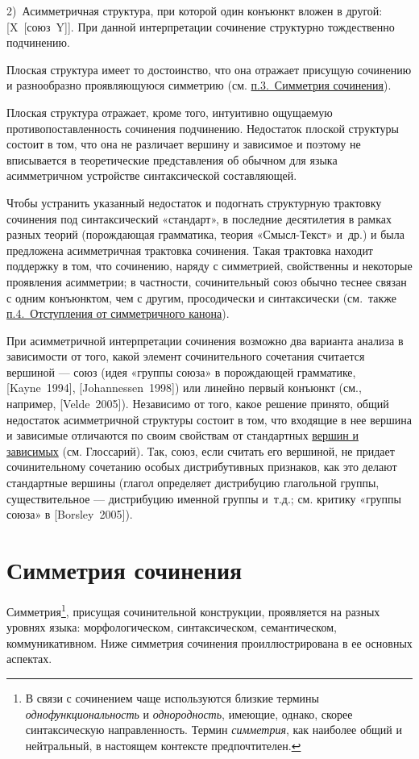 2)~Асимметричная структура, при которой один конъюнкт вложен в другой:
{[}X~{[}союз~Y{]}{]}. При данной интерпретации сочинение структурно
тождественно подчинению.

Плоская структура имеет то достоинство, что она отражает присущую
сочинению и разнообразно проявляющуюся симметрию (см.
\underline{п.3.~Симметрия сочинения}).

Плоская структура отражает, кроме того, интуитивно ощущаемую
противопоставленность сочинения подчинению. Недостаток плоской структуры
состоит в том, что она не различает вершину и зависимое и поэтому не
вписывается в теоретические представления об обычном для языка
асимметричном устройстве синтаксической составляющей.

Чтобы устранить указанный недостаток и подогнать структурную трактовку
сочинения под синтаксический «стандарт», в последние десятилетия в
рамках разных теорий (порождающая грамматика, теория «Смысл-Текст»
и~др.) и была предложена асимметричная трактовка сочинения. Такая
трактовка находит поддержку в том, что сочинению, наряду с симметрией,
свойственны и некоторые проявления асимметрии; в частности,
сочинительный союз обычно теснее связан с одним конъюнктом, чем с
другим, просодически и синтаксически (см.~также
\underline{п.4.~Отступления от симметричного канона}).

При асимметричной интерпретации сочинения возможно два варианта анализа
в зависимости от того, какой элемент сочинительного сочетания считается
вершиной --- союз (идея «группы союза» в порождающей грамматике,
{[}Kayne~1994{]}, {[}Johannessen~1998{]}) или линейно первый конъюнкт
(см., например, {[}Velde~2005{]}). Независимо от того, какое решение
принято, общий недостаток асимметричной структуры состоит в том, что
входящие в нее вершина и зависимые отличаются по своим свойствам от
стандартных \underline{вершин и зависимых} (см. Глоссарий). Так, союз,
если считать его вершиной, не придает сочинительному сочетанию особых
дистрибутивных признаков, как это делают стандартные вершины (глагол
определяет дистрибуцию глагольной группы, существительное --- дистрибуцию
именной группы и~т.д.; см. критику «группы союза» в {[}Borsley~2005{]}).

\section{Симметрия
сочинения}\label{ux441ux438ux43cux43cux435ux442ux440ux438ux44f-ux441ux43eux447ux438ux43dux435ux43dux438ux44f}

Симметрия\footnote{В связи с сочинением чаще используются близкие
  термины \textit{однофункциональность} и \textit{однородность}, имеющие,
  однако, скорее синтаксическую направленность. Термин \textit{симметрия},
  как наиболее общий и нейтральный, в настоящем контексте
  предпочтителен.}, присущая сочинительной конструкции, проявляется на
разных уровнях языка: морфологическом, синтаксическом, семантическом,
коммуникативном. Ниже симметрия сочинения проиллюстрирована в ее
основных аспектах.

